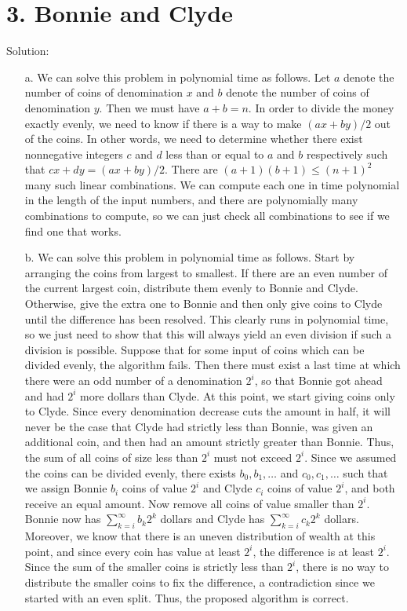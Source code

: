 \documentclass{article}
\begin{document}
\section*{3. Bonnie and Clyde}
Solution:
\begin{enumerate}
    \item[a.] We can solve this problem in polynomial time as follows. Let \( a \) denote the number of coins of denomination \( x \) and \( b \) denote the number of coins of denomination \( y \). Then we must have \( a + b = n \). In order to divide the money exactly evenly, we need to know if there is a way to make \( (ax + by)/2 \) out of the coins. In other words, we need to determine whether there exist nonnegative integers \( c \) and \( d \) less than or equal to \( a \) and \( b \) respectively such that \( cx + dy = (ax + by)/2 \). There are \( (a + 1)(b + 1) \leq (n + 1)^2 \) many such linear combinations. We can compute each one in time polynomial in the length of the input numbers, and there are polynomially many combinations to compute, so we can just check all combinations to see if we find one that works.
    \item[b.] We can solve this problem in polynomial time as follows. Start by arranging the coins from largest to smallest. If there are an even number of the current largest coin, distribute them evenly to Bonnie and Clyde. Otherwise, give the extra one to Bonnie and then only give coins to Clyde until the difference has been resolved. This clearly runs in polynomial time, so we just need to show that this will always yield an even division if such a division is possible. Suppose that for some input of coins which can be divided evenly, the algorithm fails. Then there must exist a last time at which there were an odd number of a denomination \(2^i\), so that Bonnie got ahead and had \(2^i\) more dollars than Clyde. At this point, we start giving coins only to Clyde. Since every denomination decrease cuts the amount in half, it will never be the case that Clyde had strictly less than Bonnie, was given an additional coin, and then had an amount strictly greater than Bonnie. Thus, the sum of all coins of size less than \(2^i\) must not exceed \(2^i\). Since we assumed the coins can be divided evenly, there exists \(b_0, b_1, \ldots\) and \(c_0, c_1, \ldots\) such that we assign Bonnie \(b_i\) coins of value \(2^i\) and Clyde \(c_i\) coins of value \(2^i\), and both receive an equal amount. Now remove all coins of value smaller than \(2^i\). Bonnie now has \(\sum_{k=i}^{\infty} b_k 2^k\) dollars and Clyde has \(\sum_{k=i}^{\infty} c_k 2^k\) dollars. Moreover, we know that there is an uneven distribution of wealth at this point, and since every coin has value at least \(2^i\), the difference is at least \(2^i\). Since the sum of the smaller coins is strictly less than \(2^i\), there is no way to distribute the smaller coins to fix the difference, a contradiction since we started with an even split. Thus, the proposed algorithm is correct.

\end{enumerate}
\end{document}
